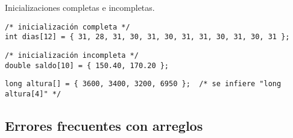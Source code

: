 \begin{ejemplo}
Inicializaciones completas e incompletas.
\begin{lstlisting}
/* inicialización completa */
int dias[12] = { 31, 28, 31, 30, 31, 30, 31, 31, 30, 31, 30, 31 };   
\end{lstlisting}
\begin{lstlisting}
/* inicialización incompleta */
double saldo[10] = { 150.40, 170.20 };     
\end{lstlisting}
\begin{lstlisting}
long altura[] = { 3600, 3400, 3200, 6950 };  /* se infiere "long altura[4]" */
\end{lstlisting}
\end{ejemplo}

\subsection{Errores frecuentes con arreglos}

